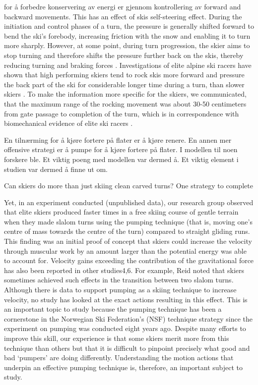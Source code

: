 \documentclass[letterpaper,10pt]{article}
\begin{document}
for å forbedre konservering av energi er gjennom kontrollering av forward and backward movements. This has an effect of skis self-steering effect. During the initiation and control phases of a turn, the pressure is generally shifted forward to bend the ski's forebody, increasing friction with the snow and enabling it to turn more sharply. However, at some point, during turn progression, the skier aims to stop turning and therefore shifts the pressure further back on the skis, thereby reducing turning and braking forces \cite{lemaster_skiers_1999, lemaster_ultimate_2010}. Investigations of elite alpine ski racers have shown that high performing skiers tend to rock skis more forward and pressure the back part of the ski for considerable longer time during a turn, than slower skiers \cite{reid_kinematic_2010, tjorhom_beskrivelse_2007, reid_alpine_2020}. To make the information more specific for the skiers, we communicated, that the maximum range of the rocking movement was about 30-50 centimeters from gate passage to completion of the turn, which is in correspondence with biomechanical evidence of elite ski racers \cite{reid_kinematic_2010}. 




En tilnærming for å kjøre fortere på flater er å kjøre renere. En annen mer offensive strategi er å pumpe for å kjøre fortere på flater. I modellen til noen forskere ble. Et viktig poeng med modellen var dermed å. Et viktig element i studien var dermed å finne ut om. 

Can skiers do more than just skiing clean carved turns? One strategy to complete 







Yet, in an experiment conducted (unpublished data), our research group observed that elite skiers produced faster times in a free skiing course of gentle terrain when they made slalom turns using the pumping technique (that is, moving one’s centre of mass towards the centre of the turn) compared to straight gliding runs. This finding was an initial proof of concept that skiers could increase the velocity through muscular work by an amount larger than the potential energy was able to account for. Velocity gains exceeding the contribution of the gravitational force has also been reported in other studies4,6. For example, Reid noted that skiers sometimes achieved such effects in the transition between two slalom turns. Although there is data to support pumping as a skiing technique to increase velocity, no study has looked at the exact actions resulting in this effect. This is an important topic to study because the pumping technique has been a cornerstone in the Norwegian Ski Federation’s (NSF) technique strategy since the experiment on pumping was conducted eight years ago. Despite many efforts to improve this skill, our experience is that some skiers merit more from this technique than others but that it is difficult to pinpoint precisely what good and bad ‘pumpers’ are doing differently. Understanding the motion actions that underpin an effective pumping technique is, therefore, an important subject to study.
\end{document}
